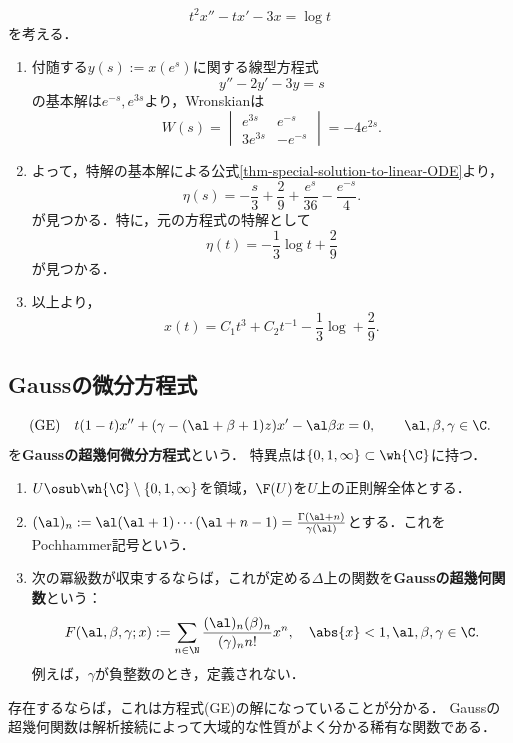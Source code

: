 \documentclass[uplatex,dvipdfmx]{jsreport}
\begin{document}
\begin{example}
    \[t^2x''-tx'-3x=\log t\]
    を考える．
    \begin{enumerate}
        \item 付随する$y(s):=x(e^s)$に関する線型方程式
        \[y''-2y'-3y=s\]
        の基本解は$e^{-s},e^{3s}$より，Wronskianは
        \[W(s)=\begin{vmatrix}
            e^{3s}&e^{-s}\\3e^{3s}&-e^{-s}
        \end{vmatrix}=-4e^{2s}.\]
        \item よって，特解の基本解による公式\ref{thm-special-solution-to-linear-ODE}より，
        \[\eta(s)=-\frac{s}{3}+\frac{2}{9}+\frac{e^s}{36}-\frac{e^{-s}}{4}.\]
        が見つかる．特に，元の方程式の特解として
        \[\eta(t)=-\frac{1}{3}\log t+\frac{2}{9}\]
        が見つかる．
        \item 以上より，
        \[x(t)=C_1t^3+C_2t^{-1}-\frac{1}{3}\log +\frac{2}{9}.\]
    \end{enumerate}
\end{example}

\subsection{Gaussの微分方程式}

\begin{tcolorbox}[colframe=ForestGreen, colback=ForestGreen!10!white,breakable,colbacktitle=ForestGreen!40!white,coltitle=black,fonttitle=\bfseries\sffamily,
title=]
    
\end{tcolorbox}

\begin{problem}
    \[\text{(GE)}\quad t(1-t)x''+(\gamma-(\al+\beta+1)z)x'-\al\beta x=0,\qquad\al,\beta,\gamma\in\C.\]
    を\textbf{Gaussの超幾何微分方程式}という．
    特異点は$\{0,1,\infty\}\subset\wh{\C}$に持つ．
    \begin{enumerate}
        \item $U\osub\wh{\C}\setminus\{0,1,\infty\}$を領域，$\F(U)$を$U$上の正則解全体とする．
        \item $(\al)_n:=\al(\al+1)\cdots(\al+n-1)=\frac{\Gamma(\al+n)}{\gamma(\al)}$とする．これをPochhammer記号という．
        \item 次の冪級数が収束するならば，これが定める$\Delta$上の関数を\textbf{Gaussの超幾何関数}という：
        \[F(\al,\beta,\gamma;x):=\sum_{n\in\N}\frac{(\al)_n(\beta)_n}{(\gamma)_nn!}x^n,\quad\abs{x}<1,\al,\beta,\gamma\in\C.\]
        例えば，$\gamma$が負整数のとき，定義されない．
    \end{enumerate}
    存在するならば，これは方程式(GE)の解になっていることが分かる．
    Gaussの超幾何関数は解析接続によって大域的な性質がよく分かる稀有な関数である．
\end{problem}
\end{document}
